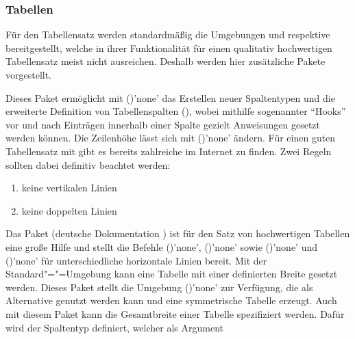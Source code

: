 \subsubsection{%
  Tabellen%
}

Für den Tabellensatz werden standardmäßig die Umgebungen  
und  respektive  bereitgestellt, 
welche in ihrer Funktionalität für einen qualitativ hochwertigen Tabellensatz 
meist nicht ausreichen. Deshalb werden hier zusätzliche Pakete vorgestellt. 

\begin{DeclarePackages}[Tabellen|?]
  Dieses Paket ermöglicht mit ()'none' das 
  Erstellen neuer Spaltentypen und die erweiterte Definition von Tabellenspalten
  (\PValue{>\MPValue{\dots}}\PValue{<\MPValue{\dots}}), 
  wobei mithilfe sogenannter \enquote{Hooks} vor und nach Einträgen innerhalb 
  einer Spalte gezielt Anweisungen gesetzt werden können. Die Zeilenhöhe lässt 
  sich mit ()'none' ändern. 
  Für einen guten Tabellensatz mit  gibt es bereits zahlreiche 
   im 
  Internet zu finden. Zwei Regeln sollten dabei definitiv beachtet werden:
  \begin{enumerate}[itemindent=0pt,labelwidth=*,labelsep=1em,label=\Roman*.]
  \item keine vertikalen Linien
  \item keine doppelten Linien
  \end{enumerate}
  Das Paket  (deutsche Dokumentation ) 
  ist für den Satz von hochwertigen Tabellen eine große Hilfe und stellt die 
  Befehle ()'none', 
  ()'none' sowie 
  ()'none' und 
  ()'none'
  für unterschiedliche horizontale Linien bereit.
  Mit der Standard"="=Umgebung  kann eine 
  Tabelle mit einer definierten Breite gesetzt werden. Dieses Paket stellt die 
  Umgebung ()'none' zur Verfügung, 
  die als Alternative genutzt werden kann und eine symmetrische Tabelle erzeugt.
  Auch mit diesem Paket kann die Gesamtbreite einer Tabelle spezifiziert 
  werden. Dafür wird der Spaltentyp  definiert, welcher als Argument 

\end{DeclarePackages}
